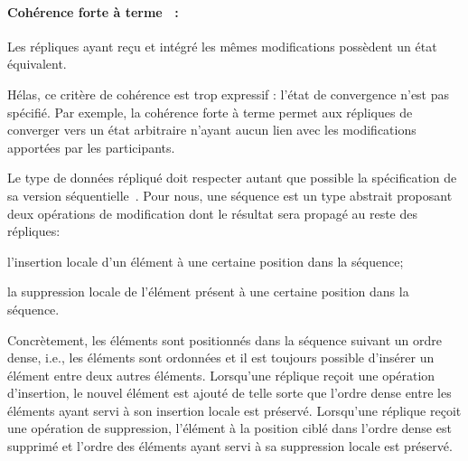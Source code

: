 \paragraph{Cohérence forte à terme~\cite{shapiro2011conflict} :} Les répliques
ayant reçu et intégré les mêmes modifications possèdent un état équivalent.

\noindent Hélas, ce critère de cohérence est trop expressif : l'état de
convergence n'est pas spécifié. Par exemple, la cohérence forte à terme permet
aux répliques de converger vers un état arbitraire n'ayant aucun lien avec les
modifications apportées par les participants.



Le type de données répliqué doit respecter autant que possible la spécification
de sa version séquentielle~\cite{bieniusa2012brief}. Pour nous, une séquence est
un type abstrait proposant deux opérations de modification dont le résultat sera
propagé au reste des répliques:
\begin{inparaenum}[(i)]
\item l'insertion locale d'un élément à une certaine position dans la séquence; 
\item la suppression locale de l'élément présent à une certaine position dans la
  séquence.
\end{inparaenum}
Concrètement, les éléments sont positionnés dans la séquence suivant un ordre
dense, i.e., les éléments sont ordonnées et il est toujours possible d'insérer
un élément entre deux autres éléments. Lorsqu'une réplique reçoit une opération
d'insertion, le nouvel élément est ajouté de telle sorte que l'ordre dense entre
les éléments ayant servi à son insertion locale est préservé. Lorsqu'une
réplique reçoit une opération de suppression, l'élément à la position ciblé dans
l'ordre dense est supprimé et l'ordre des éléments ayant servi à sa suppression
locale est préservé. 


